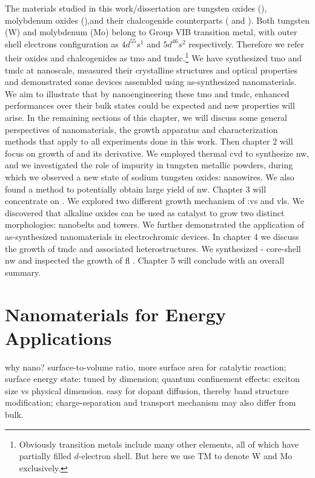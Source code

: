 The materials studied in this work/dissertation are tungsten oxides (), molybdenum oxides (),and their chalcogenide counterparts ( and ). Both tungsten (W) and molybdenum (Mo) belong to Group VIB transition metal, with outer shell electrons configuration as $4d^55s^1$ and $5d^46s^2$ respectively. Therefore we refer their oxides and chalcogenides as \gls{tmo} and \gls{tmdc}.\footnote{Obviously transition metals include many other elements, all of which have partially filled $d$-electron shell. But here we use TM to denote W and Mo exclusively.} We have synthesized \gls{tmo} and \gls{tmdc} at nanoscale, measured their crystalline structures and optical properties and demonstrated some devices assembled using as-synthesized nanomaterials. We aim to illustrate that by nanoengineering these \gls{tmo} and \gls{tmdc}, enhanced performances over their bulk states could be expected and new properties will arise. In the remaining sections of this chapter, we will discuss some general perspectives of nanomaterials, the growth apparatus and characterization methods that apply to all experiments done in this work. Then chapter 2 will focus on growth of  and its derivative. We employed thermal \gls{cvd} to synthesize  \gls{nw}, and we investigated the role of impurity in tungsten metallic powders, during which we observed a new state of sodium tungsten oxides:  nanowires. We also found a method to potentially obtain large yield of  \gls{nw}. Chapter 3 will concentrate on . We explored two different growth mechanism of :\gls{vs} and \gls{vls}. We discovered that alkaline oxides can be used as catalyst to grow two distinct  morphologies: nanobelts and towers. We further demonstrated the application of as-synthesized  nanomaterials in electrochromic devices.  In chapter 4 we discuss the growth of \gls{tmdc} and associated heterostructures. We synthesized - core-shell \gls{nw} and inspected the growth of \gls{fl} . Chapter 5 will conclude with an overall summary.



\section{Nanomaterials for Energy Applications}

why nano? surface-to-volume ratio, more surface area for catalytic reaction; surface energy state: tuned by dimension; quantum confinement effects: exciton size vs physical dimension. easy for dopant diffusion, thereby band structure modification; charge-separation and transport mechanism may also differ from bulk.


